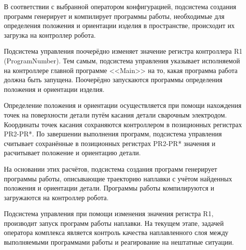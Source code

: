 В соответствии с выбранной оператором конфигурацией, подсистема создания программ генерирует и компилирует программы работы, необходимые для определения положения и ориентации изделия в пространстве, происходит их загрузка на контроллер робота.

Подсистема управления поочерёдно изменяет значение регистра контроллера R1 (ProgramNumber).
Тем самым, подсистема управления указывает исполняемой на контроллере главной программе <<Main>> на то, какая программа работа должна быть запущена.
Поочерёдно запускаются программы определения положения и ориентации изделия.

Определение положения и ориентации осуществляется при помощи нахождения точек на поверхности детали путём касания детали сварочным электродом.
Координаты точек касания сохраняются контроллером в позиционных регистрах PR2-PR*.
По завершении выполнения программ, подсистема управления считывает сохранённые в позиционных регистрах PR2-PR* значения и расчитывает положение и ориентацию детали.

На основании этих расчётов, подсистема создания программ генерирует программы работы, описывающие траекторию наплавки с учётом найденных положения и ориентации детали.
Программы работы компилируются и загружаются на контроллер робота.

Подсистема управления при помощи изменения значения регистра R1, производит запуск программ работы наплавки.
На текущем этапе, задачей оператора комплекса является контроль качества наплавленного слоя между выполняемыми программами работы и реагирование на нештатные ситуации.
